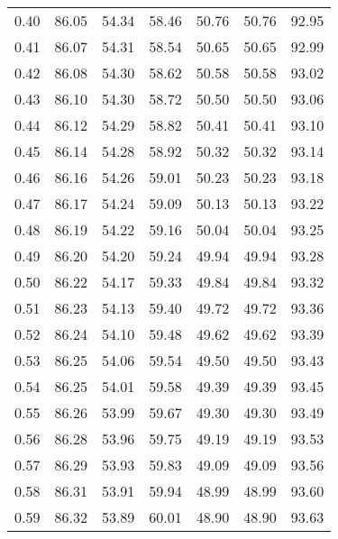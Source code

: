\begin{tabular}{|c|c|c|c|c|c|c|}
      0.40 &     86.05 &     54.34 &      58.46 &   50.76 &      50.76 &         92.95 \\
      0.41 &     86.07 &     54.31 &      58.54 &   50.65 &      50.65 &         92.99 \\
      0.42 &     86.08 &     54.30 &      58.62 &   50.58 &      50.58 &         93.02 \\
      0.43 &     86.10 &     54.30 &      58.72 &   50.50 &      50.50 &         93.06 \\
      0.44 &     86.12 &     54.29 &      58.82 &   50.41 &      50.41 &         93.10 \\
      0.45 &     86.14 &     54.28 &      58.92 &   50.32 &      50.32 &         93.14 \\
      0.46 &     86.16 &     54.26 &      59.01 &   50.23 &      50.23 &         93.18 \\
      0.47 &     86.17 &     54.24 &      59.09 &   50.13 &      50.13 &         93.22 \\
      0.48 &     86.19 &     54.22 &      59.16 &   50.04 &      50.04 &         93.25 \\
      0.49 &     86.20 &     54.20 &      59.24 &   49.94 &      49.94 &         93.28 \\
      0.50 &     86.22 &     54.17 &      59.33 &   49.84 &      49.84 &         93.32 \\
      0.51 &     86.23 &     54.13 &      59.40 &   49.72 &      49.72 &         93.36 \\
      0.52 &     86.24 &     54.10 &      59.48 &   49.62 &      49.62 &         93.39 \\
      0.53 &     86.25 &     54.06 &      59.54 &   49.50 &      49.50 &         93.43 \\
      0.54 &     86.25 &     54.01 &      59.58 &   49.39 &      49.39 &         93.45 \\
      0.55 &     86.26 &     53.99 &      59.67 &   49.30 &      49.30 &         93.49 \\
      0.56 &     86.28 &     53.96 &      59.75 &   49.19 &      49.19 &         93.53 \\
      0.57 &     86.29 &     53.93 &      59.83 &   49.09 &      49.09 &         93.56 \\
      0.58 &     86.31 &     53.91 &      59.94 &   48.99 &      48.99 &         93.60 \\
      0.59 &     86.32 &     53.89 &      60.01 &   48.90 &      48.90 &         93.63 \\

\end{tabular}
